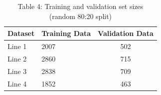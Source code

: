 \begin{table}[ht]
\centering
\caption{Table 4: Training and validation set sizes (random 80:20 split)}
\begin{tabular}{llc}
\hline
Dataset & Training Data & Validation Data \\
\hline
Line 1 & 2007 & 502 \\
Line 2 & 2860 & 715 \\
Line 3 & 2838 & 709 \\
Line 4 & 1852 & 463 \\
\hline
\end{tabular}
\end{table}
